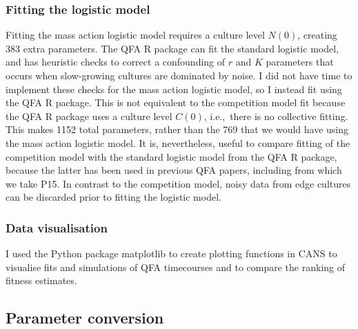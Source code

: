 \subsubsection{Fitting the logistic model}

Fitting the mass action logistic model requires a culture level
\(N(0)\), creating 383 extra parameters. The QFA R package
\citep{qfa2016} can fit the standard logistic model, and has heuristic
checks to correct a confounding of \(r\) and \(K\) parameters that
occurs when slow-growing cultures are dominated by noise. I did not
have time to implement these checks for the mass action logistic
model, so I instead fit using the QFA R package. This is not
equivalent to the competition model fit because the QFA R package uses
a culture level \(C(0)\), i.e.,~there is no collective fitting. This
makes 1152 total parameters, rather than the 769 that we would have
using the mass action logistic model. It is, nevertheless, useful to
compare fitting of the competition model with the standard logistic
model from the QFA R package, because the latter has been used in
previous QFA papers, including \citet{Addinall2011} from which we take
P15.
In contrast to the competition model, noisy data from edge cultures
can be discarded prior to fitting the logistic model.

\subsubsection{Data visualisation}

I used the Python package matplotlib to create plotting functions in
CANS to visualise fits and simulations of QFA timecourses and to
compare the ranking of fitness estimates.

\subsection{Parameter conversion}
\label{sec:parameter_conversion}

